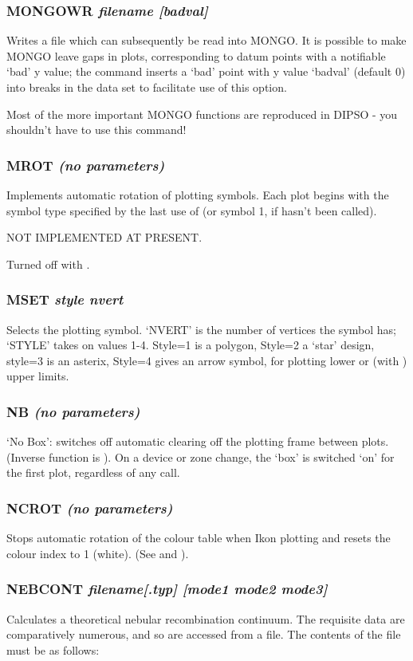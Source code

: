 \documentclass[twoside,11pt,noabs,nolof]{starlink}
\providecommand{\dipcom}[3]{\subsubsection*{\label{COM:#1}\textbf{#1} \emph{#2}}}
\begin{document}
\dipcom{MONGOWR}{filename [badval]}{Writes a file which can be read by MONGO}
Writes a file which can subsequently be read into MONGO. It is
possible to make MONGO leave gaps in plots, corresponding to datum
points with a notifiable `bad' y value; the   command inserts a
`bad' point with y value `badval' (default 0) into breaks in the
data set to facilitate use of this option.

Most of the more important MONGO functions are reproduced in DIPSO -
you shouldn't have to use this command!

\dipcom{MROT}{(no parameters)}{Causes automatic rotation of plotting symbols}
Implements automatic rotation of plotting symbols. Each plot begins
with the symbol type specified by the last use of   (or symbol 1,
if   hasn't been called).

NOT IMPLEMENTED AT PRESENT.

Turned off with .

\dipcom{MSET}{style nvert}{Selects the symbol to be used if {\texttt{MARK}} plots are being created}
Selects the   plotting symbol. `NVERT' is the number of vertices
the symbol has; `STYLE' takes on values 1-4. Style=1 is a polygon,
Style=2 a `star' design, style=3 is an asterix, Style=4 gives an arrow
symbol, for plotting lower or (with )  upper limits.

\dipcom{NB}{(no parameters)}{Stops automatic clearing of the plotting frame between plots}
`No Box': switches off automatic clearing off the plotting frame
between plots. (Inverse function is ).  On a device or zone change,
the `box' is switched `on' for the first plot, regardless of any 
call.

\dipcom{NCROT}{(no parameters)}{Stops automatic rotation of the colour table}
Stops automatic rotation of the colour table when Ikon plotting and
resets the colour index to 1 (white). (See   and ).

\dipcom{NEBCONT}{filename[.typ] [mode1 mode2 mode3]}{Calculates a theoretical nebular re-combination continuum}
Calculates a theoretical nebular recombination continuum. The
requisite data are comparatively numerous, and so are accessed from a
file. The contents of the file must be as follows:
\end{document}
